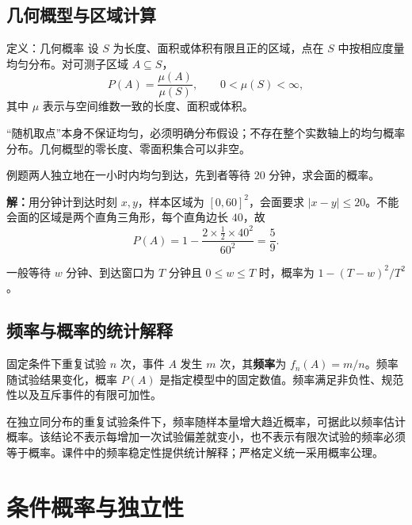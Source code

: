 \documentclass[UTF8,fontset=none,zihao=-4,a4paper]{ctexart}
\newcommand{\term}[1]{\textbf{#1}}
\newcommand{\example}[1]{\begin{infobox}{例题}#1\end{infobox}}
\newcommand{\solution}{\par\noindent\textbf{解：}}
\newcommand{\chapterpage}[1]{\clearpage\section{#1}}
\begin{document}
\subsection{几何概型与区域计算}
\begin{infobox}{定义：几何概率}
设 $S$ 为长度、面积或体积有限且正的区域，点在 $S$ 中按相应度量均匀分布。对可测子区域 $A\subseteq S$，
\[
P(A)=\frac{\mu(A)}{\mu(S)},\qquad 0<\mu(S)<\infty,
\]
其中 $\mu$ 表示与空间维数一致的长度、面积或体积。
\end{infobox}
“随机取点”本身不保证均匀，必须明确分布假设；不存在整个实数轴上的均匀概率分布。几何概型的零长度、零面积集合可以非空。
\example{两人独立地在一小时内均匀到达，先到者等待 $20$ 分钟，求会面的概率。}
\solution 用分钟计到达时刻 $x,y$，样本区域为 $[0,60]^2$，会面要求 $|x-y|\le20$。不能会面的区域是两个直角三角形，每个直角边长 $40$，故
\[
P(A)=1-\frac{2\times\frac12\times40^2}{60^2}=\frac59.
\]
\begin{center}\end{center}
一般等待 $w$ 分钟、到达窗口为 $T$ 分钟且 $0\le w\le T$ 时，概率为 $1-(T-w)^2/T^2$。
\subsection{频率与概率的统计解释}
固定条件下重复试验 $n$ 次，事件 $A$ 发生 $m$ 次，其\term{频率}为 $f_n(A)=m/n$。频率随试验结果变化，概率 $P(A)$ 是指定模型中的固定数值。频率满足非负性、规范性以及互斥事件的有限可加性。

在独立同分布的重复试验条件下，频率随样本量增大趋近概率，可据此以频率估计概率。该结论不表示每增加一次试验偏差就变小，也不表示有限次试验的频率必须等于概率。课件中的频率稳定性提供统计解释；严格定义统一采用概率公理。

\chapterpage{条件概率与独立性}
\end{document}
